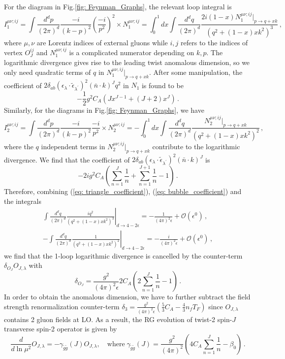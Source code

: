 \documentclass[letterpaper,11pt]{article}
\def\beq{\begin{equation}}
\def\eeq{\end{equation}}
\def\bea{\begin{eqnarray}}
\def\eea{\end{eqnarray}}
\def\beq{\begin{equation}}
\def\eeq{\end{equation}}
\begin{document}
For the diagram in Fig.\ref{fig: Feynman_Graphs}, the relevant loop integral is
\beq
I_1^{\mu\nu;ij}=\int \frac{d^d p}{(2\pi)^d} \frac{-i}{(k-p)^2}\left( \frac{-i}{p^2}\right)^2\times N_1^{\mu\nu;ij}=\int_0^1 dx \int \frac{d^d q}{(2\pi)^d} \frac{2i(1-x) N_1^{\mu\nu;ij}|_{p\to q+x k}}{(q^2+(1-x)x k^2)^3}\,,
\eeq
where $\mu,\nu$ are Lorentz indices of external gluons while $i,j$ refers to the indices of vertex $O_{J}^{ij}$ and $N_1^{\mu\nu;ij}$ is a complicated numerator depending on $k,p$. The logarithmic divergence gives rise to the leading twist anomalous dimension, so we only need quadratic terms of $q$ in $N_1^{\mu\nu,ij}|_{p\to q+ xk}$.  After some manipulation, the coefficient of $2\delta_{ab} (\epsilon_\lambda\cdot\tilde{\epsilon}_{\lambda^\prime})^2 (\bar{n}\cdot k)^J q^2$ in $N_1$ is found to be
\beq
-\frac{1}{2} g^2 C_A \left(J x^{J-1}+(J+2)x^J \right) \label{eq: triangle_coefficient}\,.
\eeq
%
Similarly, for the diagrams in Fig.\ref{fig: Feynman_Graphs}, we have
\beq
I_2^{\mu\nu;ij}=\int \frac{d^d p}{(2\pi)^d} \frac{-i}{(k-p)^2} \frac{-i}{p^2}\times N_2^{\mu\nu;ij}=-\int_0^1 dx \int \frac{d^d q}{(2\pi)^d} \frac{ N_2^{\mu\nu;ij}|_{p\to q+x k}}{(q^2+(1-x)x k^2)^2}\,,
\eeq
where the $q$ independent terms in $N_2^{\mu\nu;ij}|_{p\to q+ xk}$ contribute to the logarithmic divergence. We find that the coefficient of $2\delta_{ab}(\epsilon_\lambda\cdot\tilde{\epsilon}_{\lambda^\prime})^2 (\bar{n}\cdot k)^J$ is
\beq
-2 i g^2 C_A \left(\sum_{n=1}^{J} \frac{1}{n}+ \sum_{n=1}^{J+1}\frac{1}{n}-1 \right)\,. \label{eq: bubble_coefficient}
\eeq
 Therefore, combining (\ref{eq: triangle_coefficient}), (\ref{eq: bubble_coefficient}) and the integrals
\bea
\left. \int \frac{d^{d}q}{(2\pi)^d} \frac{i q^2}{(q^2+(1-x)x k^2)^3}\right|_{d\to 4-2\epsilon}=-\frac{1}{(4\pi)^2\epsilon}+\mathcal{O}(\epsilon^0)\,,\\
\left. -\int \frac{d^d q}{(2\pi)^d} \frac{1}{(q^2+(1-x)x k^2)^2}\right|_{d\to 4-2\epsilon}=-\frac{i}{(4\pi)^2\epsilon}+\mathcal{O}(\epsilon^0)\,,
\eea
we find that the 1-loop logarithmic divergence is cancelled by the counter-term $\delta_{O_J} O_{J,\lambda}$ with
\beq
\delta_{O_J}= \frac{g^2}{(4\pi)^2\epsilon} 2C_A \left(2\sum_{n=1}^J\frac{1}{n}-1\right)\,.
\eeq
In order to obtain the anomalous dimension, we have to further subtract the field strength renormalization counter-term $\displaystyle \delta_3= \frac{g^2}{(4\pi)^2 \epsilon} \left( \frac{5}{3} C_A - \frac{4}{3}n_f T_F \right)$ since $O_{J,\lambda}$ contains 2 gluon fields at LO. As a result, the RG evolution of twist-2 spin-$J$ transverse spin-2 operator is given by
\beq
\frac{d}{d\ln \mu^2} O_{J,\lambda} = -\gamma_{\tilde{g}\tilde{g}}(J) O_{J,\lambda}, \quad \text{where}\; \gamma_{\tilde{g}\tilde{g}}(J)=\frac{g^2}{(4\pi)^2} \left(4C_A \sum_{n=1}^{J} \frac{1}{n}-\beta_0 \right)\,.
\eeq
\end{document}
